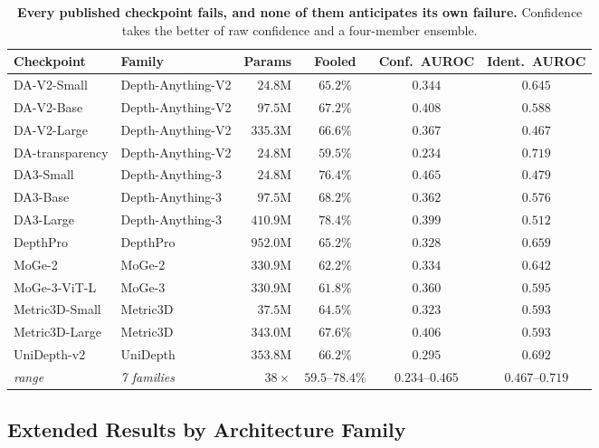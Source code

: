 \documentclass{article} %
\theoremstyle{defstyle}
\theoremstyle{plain}
\begin{document}
\begin{table}[!ht]
\caption{\textbf{Every published checkpoint fails, and none of them anticipates its own failure.}
Confidence takes the better of raw confidence and a four-member ensemble.}
\label{tab:models}
\begin{center}
\footnotesize
\begin{tabular}{llrccc}
\toprule
\textbf{Checkpoint} & \textbf{Family} & \textbf{Params} & \textbf{Fooled} &
\textbf{Conf.\ AUROC} & \textbf{Ident.\ AUROC} \\
\midrule
DA-V2-Small     & Depth-Anything-V2 & $24.8$M  & $65.2\%$ & $0.344$ & $0.645$ \\
DA-V2-Base      & Depth-Anything-V2 & $97.5$M  & $67.2\%$ & $0.408$ & $0.588$ \\
DA-V2-Large     & Depth-Anything-V2 & $335.3$M & $66.6\%$ & $0.367$ & $0.467$ \\
DA-transparency & Depth-Anything-V2 & $24.8$M  & $\mathbf{59.5\%}$ & $\mathbf{0.234}$ & $0.719$ \\
DA3-Small       & Depth-Anything-3  & $24.8$M  & $76.4\%$ & $0.465$ & $0.479$ \\
DA3-Base        & Depth-Anything-3  & $97.5$M  & $68.2\%$ & $0.362$ & $0.576$ \\
DA3-Large       & Depth-Anything-3  & $410.9$M & $\mathbf{78.4\%}$ & $0.399$ & $0.512$ \\
DepthPro        & DepthPro          & $952.0$M & $65.2\%$ & $0.328$ & $0.659$ \\
MoGe-2          & MoGe-2            & $330.9$M & $62.2\%$ & $0.334$ & $0.642$ \\
MoGe-3-ViT-L    & MoGe-3            & $330.9$M & $61.8\%$ & $0.360$ & $0.595$ \\
Metric3D-Small  & Metric3D          & $37.5$M  & $64.5\%$ & $0.323$ & $0.593$ \\
Metric3D-Large  & Metric3D          & $343.0$M & $67.6\%$ & $0.406$ & $0.593$ \\
UniDepth-v2     & UniDepth          & $353.8$M & $66.2\%$ & $0.295$ & $0.692$ \\
\midrule
\emph{range} & \emph{7 families} & $38\times$ & $59.5$--$78.4\%$ & $0.234$--$0.465$ & $0.467$--$0.719$ \\
\bottomrule
\end{tabular}
\end{center}
\end{table}

\subsection{Extended Results by Architecture Family}
\label{sec:supp-family}
\end{document}
